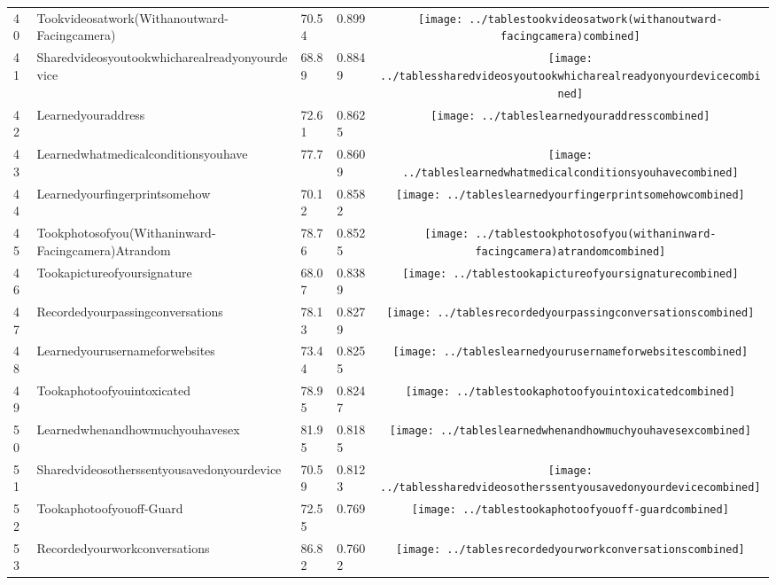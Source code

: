 \documentclass[a4paper,12pt]{article}
\begin{document}
\begin{longtable}{| p{0.5cm} | p{7cm} | p{1cm} |p{1cm} | c |}
40 & Tookvideosatwork(Withanoutward-Facingcamera) & 70.54 & 0.899&\texttt{[image: ../tablestookvideosatwork(withanoutward-facingcamera)combined]} \\ 
41 & Sharedvideosyoutookwhicharealreadyonyourdevice & 68.89 & 0.8849&\texttt{[image: ../tablessharedvideosyoutookwhicharealreadyonyourdevicecombined]} \\ 
42 & Learnedyouraddress & 72.61 & 0.8625&\texttt{[image: ../tableslearnedyouraddresscombined]} \\ 
43 & Learnedwhatmedicalconditionsyouhave & 77.7 & 0.8609&\texttt{[image: ../tableslearnedwhatmedicalconditionsyouhavecombined]} \\ 
44 & Learnedyourfingerprintsomehow & 70.12 & 0.8582&\texttt{[image: ../tableslearnedyourfingerprintsomehowcombined]} \\ 
45 & Tookphotosofyou(Withaninward-Facingcamera)Atrandom & 78.76 & 0.8525&\texttt{[image: ../tablestookphotosofyou(withaninward-facingcamera)atrandomcombined]} \\ 
46 & Tookapictureofyoursignature & 68.07 & 0.8389&\texttt{[image: ../tablestookapictureofyoursignaturecombined]} \\ 
47 & Recordedyourpassingconversations & 78.13 & 0.8279&\texttt{[image: ../tablesrecordedyourpassingconversationscombined]} \\ 
48 & Learnedyourusernameforwebsites & 73.44 & 0.8255&\texttt{[image: ../tableslearnedyourusernameforwebsitescombined]} \\ 
49 & Tookaphotoofyouintoxicated & 78.95 & 0.8247&\texttt{[image: ../tablestookaphotoofyouintoxicatedcombined]} \\ 
50 & Learnedwhenandhowmuchyouhavesex & 81.95 & 0.8185&\texttt{[image: ../tableslearnedwhenandhowmuchyouhavesexcombined]} \\ 
51 & Sharedvideosotherssentyousavedonyourdevice & 70.59 & 0.8123&\texttt{[image: ../tablessharedvideosotherssentyousavedonyourdevicecombined]} \\ 
52 & Tookaphotoofyouoff-Guard & 72.55 & 0.769&\texttt{[image: ../tablestookaphotoofyouoff-guardcombined]} \\ 
53 & Recordedyourworkconversations & 86.82 & 0.7602&\texttt{[image: ../tablesrecordedyourworkconversationscombined]} \\ 

\end{longtable}
\end{document}
